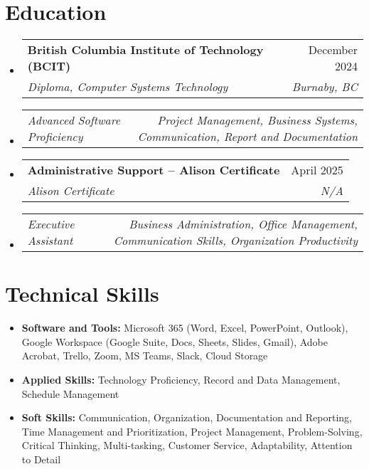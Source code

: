 \documentclass[letterpaper,11pt]{article}
\makeatletter
\newcommand{\resumeItem}[1]{
\item\small{
{#1 \vspace{-2pt}}
}
}
\newcommand{\resumeSubheading}[4]{
\vspace{-2pt}\item
\begin{tabular*}{0.97\textwidth}[t]{l@{\extracolsep{\fill}}r}
\textbf{#1} & #2 \\
\textit{\small#3} & \textit{\small #4} \\
\end{tabular*}\vspace{-7pt}
}
\newcommand{\resumeSubSubheading}[2]{
\item
\begin{tabular*}{0.97\textwidth}{l@{\extracolsep{\fill}}r}
\textit{\small#1} & \textit{\small #2} \\
\end{tabular*}\vspace{-7pt}
}
\newcommand{\resumeSubHeadingListStart}{\begin{itemize}[leftmargin=0.15in, label={}]}
\newcommand{\resumeSubHeadingListEnd}{\end{itemize}}
\makeatother
\begin{document}
\section{Education}
\resumeSubHeadingListStart
\resumeSubheading{British Columbia Institute of Technology (BCIT)}{December 2024}{Diploma, Computer Systems Technology}{Burnaby, BC}
\resumeSubSubheading{Advanced Software Proficiency}{Project Management, Business Systems, Communication, Report and Documentation}
\resumeSubheading{Administrative Support – Alison Certificate}{April 2025}{Alison Certificate}{N/A}
\resumeSubSubheading{Executive Assistant}{Business Administration, Office Management, Communication Skills, Organization Productivity}
\resumeSubHeadingListEnd

\section{Technical Skills}
\resumeSubHeadingListStart
\resumeItem{\textbf{Software and Tools:} Microsoft 365 (Word, Excel, PowerPoint, Outlook), Google Workspace (Google Suite, Docs, Sheets, Slides, Gmail), Adobe Acrobat, Trello, Zoom, MS Teams, Slack, Cloud Storage}
\resumeItem{\textbf{Applied Skills:} Technology Proficiency, Record and Data Management, Schedule Management}
\resumeItem{\textbf{Soft Skills:} Communication, Organization, Documentation and Reporting, Time Management and Prioritization, Project Management, Problem-Solving, Critical Thinking, Multi-tasking, Customer Service, Adaptability, Attention to Detail}
\resumeSubHeadingListEnd
\end{document}
